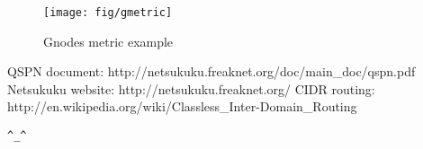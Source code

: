 \documentclass[a4paper]{article}
\newcommand{\href}[2]{ #1 }
\begin{document}
\begin{figure}[h]
	\begin{center}
		\texttt{[image: fig/gmetric]}
	\end{center}
	\caption{Gnodes metric example}
	\label{fig:gmetric}
\end{figure}


%
%
%


\begin{thebibliography}{99}
	 QSPN document:
		\href{http://netsukuku.freaknet.org/doc/main\_doc/qspn.pdf}{qspn.pdf}
	 Netsukuku website:
		\href{http://netsukuku.freaknet.org/}{http://netsukuku.freaknet.org/}
	 CIDR routing:
		\href{http://en.wikipedia.org/wiki/Classless\_Inter-Domain\_Routing}{Classless\_Inter-Domain\_Routing in Wikipedia}
\end{thebibliography}
\newpage

\begin{center}
\verb|^_^|
\end{center}
\end{document}
